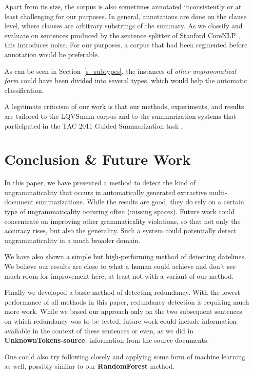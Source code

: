 \documentclass[a4paper,10pt]{scrartcl}
\theoremstyle{style}
\begin{document}
Apart from its size, the corpus is also sometimes annotated inconsistently or at least challenging for our purposes. In general, annotations are done on the clause level, where clauses are arbitrary substrings of the summary. As we classify and evaluate on sentences produced by the sentence splitter of Stanford CoreNLP \citep{manning-EtAl:2014:P14-5}, this introduces noise. For our purposes, a corpus that had been segmented before annotation would be preferable.

As can be seen in Section~\ref{s_subtypes}, the instances of \textit{other ungrammatical form} could have been divided into several types, which would help the automatic classification.

A legitimate criticism of our work is that our methods, experiments, and results are tailored to the LQVSumm corpus and to the summarization systems that participated in the TAC 2011 Guided Summarization task \citep{owczarzak2011overview}.

\newpage
\section{Conclusion \& Future Work}
\label{conclusion}

In this paper, we have presented a method to detect the kind of ungrammaticality that occurs in automatically generated extractive multi-document summarizations. While the results are good, they do rely on a certain type of ungrammaticality occuring often (missing spaces). Future work could concentrate on improving other grammaticality violations, so that not only the accuracy rises, but also the generality. Such a system could potentially detect ungrammaticality in a much broader domain.

We have also shown a simple but high-performing method of detecting datelines. We believe our results are close to what a human could achieve and don't see much room for improvement here, at least not with a variant of our method.

Finally we developed a basic method of detecting redundancy. With the lowest performance of all methods in this paper, redundancy detection is requiring much more work. While we based our approach only on the two subsequent sentences on which redundancy was to be tested, future work could include information available in the context of these sentences or even, as we did in \textbf{UnknownTokens-source}, information from the source documents.

One could also try following \cite{hatzivassiloglou1999detecting} closely and applying some form of machine learning as well, possibly similar to our \textbf{RandomForest} method.
\end{document}
